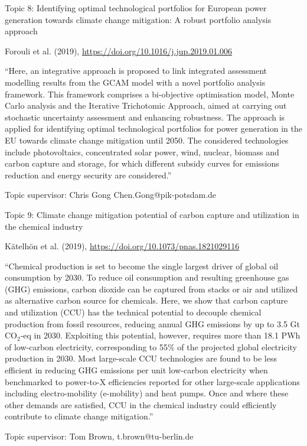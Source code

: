 \documentclass[10pt,aspectratio=169,dvipsnames]{beamer}
\begin{document}
\begin{frame}
  \begin{block}{Topic 8: Identifying optimal technological portfolios for European power generation towards climate change mitigation: A robust portfolio analysis approach}
      
    Forouli et al. (2019), \href{https://doi.org/10.1016/j.jup.2019.01.006}{https://doi.org/10.1016/j.jup.2019.01.006}
    
    \enquote{Here, an integrative approach is proposed to link integrated assessment modelling results from the GCAM model with a novel portfolio analysis framework. This framework comprises a bi-objective optimisation model, Monte Carlo analysis and the Iterative Trichotomic Approach, aimed at carrying out stochastic uncertainty assessment and enhancing robustness. The approach is applied for identifying optimal technological portfolios for power generation in the EU towards climate change mitigation until 2050. The considered technologies include photovoltaics, concentrated solar power, wind, nuclear, biomass and carbon capture and storage, for which different subsidy curves for emissions reduction and energy security are considered.}

    \hfill
    Topic supervisor: Chris Gong Chen.Gong@pik-potsdam.de
    
  \end{block}
\end{frame}


\begin{frame}
  \begin{block}{Topic 9: Climate change mitigation potential of carbon capture and utilization in the chemical industry}
      
    Kätelhön et al. (2019), \href{https://doi.org/10.1073/pnas.1821029116}{https://doi.org/10.1073/pnas.1821029116}
    
    \enquote{Chemical production is set to become the single largest driver of global oil consumption by 2030. To reduce oil consumption and resulting greenhouse gas (GHG) emissions, carbon dioxide can be captured from stacks or air and utilized as alternative carbon source for chemicals. Here, we show that carbon capture and utilization (CCU) has the technical potential to decouple chemical production from fossil resources, reducing annual GHG emissions by up to 3.5 Gt CO$_2$-eq in 2030. Exploiting this potential, however, requires more than 18.1 PWh of low-carbon electricity, corresponding to 55\% of the projected global electricity production in 2030. Most large-scale CCU technologies are found to be less efficient in reducing GHG emissions per unit low-carbon electricity when benchmarked to power-to-X efficiencies reported for other large-scale applications including electro-mobility (e-mobility) and heat pumps. Once and where these other demands are satisfied, CCU in the chemical industry could efficiently contribute to climate change mitigation.}

    \hfill
    Topic supervisor: Tom Brown, t.brown@tu-berlin.de
    
  \end{block}
\end{frame}
\end{document}
